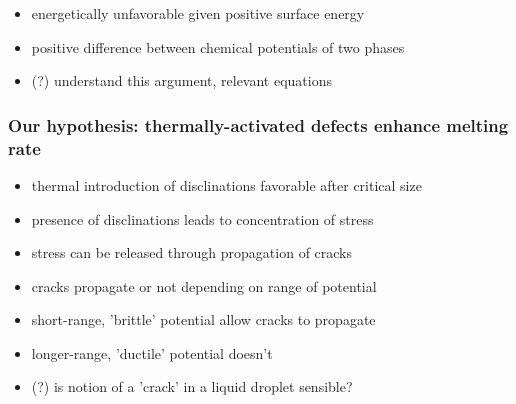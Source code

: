 \documentclass[11pt]{article}
\begin{document}
\begin{itemize}
\begin{itemize}
\begin{itemize}

\item energetically unfavorable given positive surface energy\\
\label{sec-3.1.2.4.4.1}


\item positive difference between chemical potentials of two phases\\
\label{sec-3.1.2.4.4.2}


\item (?) understand this argument, relevant equations\\
\label{sec-3.1.2.4.4.3}

\end{itemize} %
\end{itemize} %
\end{itemize} %
\subsubsection{Our hypothesis:  thermally-activated defects enhance melting rate}
\label{sec-3.1.3}

\begin{itemize}

\item thermal introduction of disclinations favorable after critical size\\
\label{sec-3.1.3.1}


\item presence of disclinations leads to concentration of stress\\
\label{sec-3.1.3.2}


\item stress can be released through propagation of cracks\\
\label{sec-3.1.3.3}


\item cracks propagate or not depending on range of potential\\
\label{sec-3.1.3.4}


\item short-range, 'brittle' potential allow cracks to propagate\\
\label{sec-3.1.3.5}


\item longer-range, 'ductile' potential doesn't\\
\label{sec-3.1.3.6}


\item (?) is notion of a 'crack' in a liquid droplet sensible?\\
\label{sec-3.1.3.7}

\end{itemize} %
\end{document}
